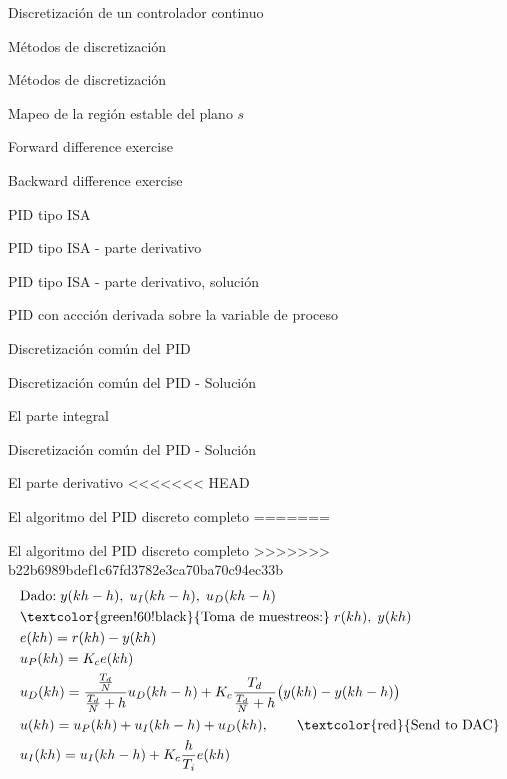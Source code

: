 \documentclass[presentation,aspectratio=1610]{beamer}
\begin{document}
\begin{frame}[label={sec:org86d23da}]{Discretización de un controlador continuo}
\begin{frame}[label={sec:org3ca2082}]{Métodos de discretización}
\begin{frame}[label={sec:orga78cff2}]{Métodos de discretización}
\begin{frame}[label={sec:org28bff53}]{Mapeo de la región estable del plano \(s\)}
\begin{frame}[label={sec:org9bb57fa}]{Forward difference exercise}
\begin{frame}[label={sec:orgaf8c1b0}]{Backward difference exercise}
\begin{frame}[label={sec:orgb2215e6}]{PID tipo ISA}
\begin{frame}[label={sec:orga06296a}]{PID tipo ISA - parte derivativo}
\begin{frame}[label={sec:org978e098}]{PID tipo ISA - parte derivativo, solución}
\begin{frame}[label={sec:orgf3b475b}]{PID con accción derivada sobre la variable de proceso}
\begin{frame}[label={sec:org5c3258e}]{Discretización común del PID}
\begin{frame}[label={sec:org95130b5}]{Discretización común del PID - Solución}
\begin{block}{El parte integral}
\begin{frame}[label={sec:org35f72c2}]{Discretización común del PID - Solución}
\begin{block}{El parte derivativo}
<<<<<<< HEAD
\begin{frame}[label={sec:org34749bc}]{El algoritmo del PID discreto completo}
=======
\begin{frame}[label={sec:org50663e5}]{El algoritmo del PID discreto completo}
>>>>>>> b22b6989bdef1c67fd3782e3ca70ba70c94ec33b
\begin{align*}
&\text{Dado:}  \;  y(kh-h), \; u_I(kh-h), \; u_D(kh-h)\\
& \text{\textcolor{green!60!black}{Toma de muestreos:}} \; r(kh), \; y(kh)\\
&e(kh) = r(kh) - y(kh)\\
&u_P(kh) = K_ce(kh)\\
&u_D(kh) = \frac{\frac{T_d}{N}}{\frac{T_d}{N} + h}u_D(kh-h) + K_c\frac{T_d}{\frac{T_d}{N} + h}\big(y(kh) - y(kh-h)\big)\\
&u(kh) = u_P(kh) + u_I(kh-h) + u_D(kh), \qquad \text{\textcolor{red}{Send to DAC}}\\
&u_I(kh) = u_I(kh-h) + K_c \frac{h}{T_i} e(kh)
\end{align*}

\begin{center}
\end{center}
\end{frame}


\end{frame}
\end{block}
\end{frame}
\end{block}
\end{frame}
\end{frame}
\end{frame}
\end{frame}
\end{frame}
\end{frame}
\end{frame}
\end{frame}
\end{frame}
\end{frame}
\end{frame}
\end{frame}
\end{document}
